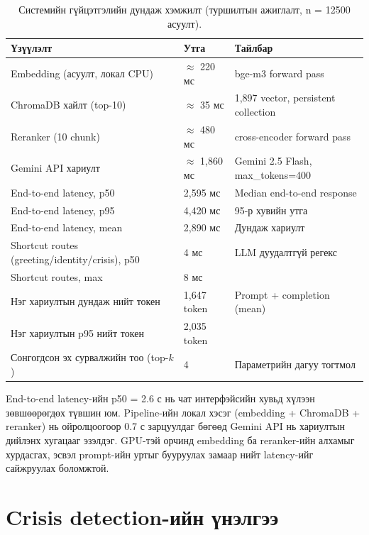 \begin{table}[H]
\centering
\begin{tabular}{|p{6.0cm}|p{2.6cm}|p{4.6cm}|}
\hline
\textbf{Үзүүлэлт} & \textbf{Утга} & \textbf{Тайлбар} \\ \hline
Embedding (асуулт, локал CPU) & $\approx$ 220 мс & bge-m3 forward pass \\ \hline
ChromaDB хайлт (top-10) & $\approx$ 35 мс & 1{,}897 vector, persistent collection \\ \hline
Reranker (10 chunk) & $\approx$ 480 мс & cross-encoder forward pass \\ \hline
Gemini API хариулт & $\approx$ 1{,}860 мс & Gemini 2.5 Flash, max\_tokens=400 \\ \hline
End-to-end latency, p50 & 2{,}595 мс & Median end-to-end response \\ \hline
End-to-end latency, p95 & 4{,}420 мс & 95-р хувийн утга \\ \hline
End-to-end latency, mean & 2{,}890 мс & Дундаж хариулт \\ \hline
Shortcut routes (greeting/identity/crisis), p50 & 4 мс & LLM дуудалтгүй регекс \\ \hline
Shortcut routes, max & 8 мс & \\ \hline
Нэг хариултын дундаж нийт токен & 1{,}647 token & Prompt + completion (mean) \\ \hline
Нэг хариултын p95 нийт токен & 2{,}035 token & \\ \hline
Сонгогдсон эх сурвалжийн тоо (top-$k$) & 4 & Параметрийн дагуу тогтмол \\ \hline
\end{tabular}
\caption[Системийн гүйцэтгэлийн үзүүлэлт]{Системийн гүйцэтгэлийн дундаж хэмжилт (туршилтын ажиглалт, n = 12500 асуулт).}
\label{tab:performance}
\end{table}


End-to-end latency-ийн p50 = 2.6 с нь чат интерфэйсийн хувьд хүлээн зөвшөөрөгдөх түвшин юм. Pipeline-ийн локал хэсэг (embedding + ChromaDB + reranker) нь ойролцоогоор 0.7 с зарцуулдаг бөгөөд Gemini API нь хариултын дийлэнх хугацааг эзэлдэг. GPU-тэй орчинд embedding ба reranker-ийн алхамыг хурдасгах, эсвэл prompt-ийн уртыг бууруулах замаар нийт latency-ийг сайжруулах боломжтой.


\section{Crisis detection-ийн үнэлгээ}

